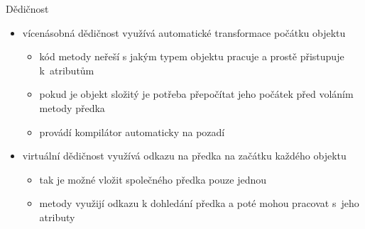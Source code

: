 \begin{frame}[fragile]
\begin{bonusblock}{Dědičnost}
\begin{itemize}
\item vícenásobná dědičnost využívá automatické transformace počátku objektu
\begin{itemize}
\item kód metody neřeší s jakým typem objektu pracuje a prostě přistupuje k~atributům
\item pokud je objekt složitý je potřeba přepočítat jeho počátek před voláním metody předka
\item provádí kompilátor automaticky na pozadí
\end{itemize}

\item virtuální dědičnost využívá odkazu na předka na začátku každého objektu
\begin{itemize}
\item tak je možné vložit společného předka pouze jednou
\item metody využijí odkazu k dohledání předka a poté mohou pracovat s~jeho atributy
\end{itemize}

\end{itemize}
\end{bonusblock}
\end{frame}